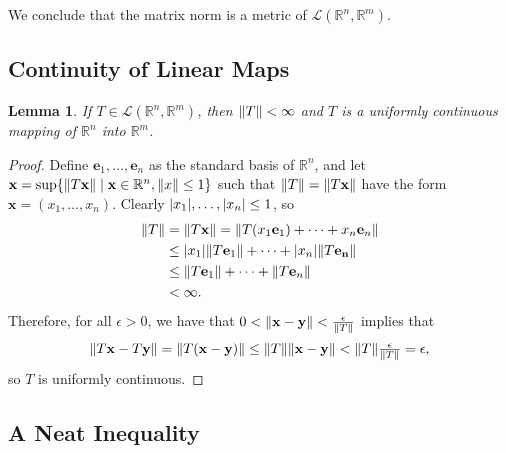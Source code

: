 \documentclass[11pt]{article}
\newtheorem*{lemma*}{Lemma}
\renewcommand{\vec}[1]{\mathbf{#1}}
\begin{document}
We conclude that the matrix norm is a metric of $\mathcal{L} (\mathbb{R}^{n}, \mathbb{R}^{m})$.

\subsection{Continuity of Linear Maps}

\begin{adjustwidth}{1cm}{}
	\begin{lemma*}
		If $T \in \mathcal{L}(\mathbb{R}^{n}, \mathbb{R}^{m})$, then $\norm{T} < \infty$ and $T$ is a uniformly continuous mapping of $\mathbb{R}^{n}$ into $\mathbb{R}^{m}$.
	\end{lemma*}
    \begin{proof}\renewcommand{\qedsymbol}{}
		Define $\vec{e}_{1}, \ldots, \vec{e}_{n}$ as the standard basis of $\mathbb{R}^{n}$, and let $\vec{x} = \sup \{ \norm{T \vec{x}} \mid \vec{x} \in \mathbb{R}^{n}, \norm{x} \le 1\}$ such that $\norm{T} = \norm{T \vec{x}}$ have the form $\vec{x} = (x_{1}, \ldots, x_{n})$. Clearly $\abs{x_{1}}, \ldots, \abs{x_{n}} \le 1$, so
		\begin{align*}
			\norm{T} &= \norm{T \vec{x}} = \norm{T(x_{1} \vec{e}_{1}) + \cdots + x_{n} \vec{e}_{n}} \\ 
			&\le \abs{x_{1}} \norm{T \vec{e}_{1}} + \cdots + \abs{x_{n}} \norm{T \vec{e_{n}}} \\
			&\le \norm{T \vec{e}_1} + \cdots + \norm{T \vec{e}_{n}} \\
			&< \infty.
		\end{align*}
		Therefore, for all $\epsilon > 0$, we have that $0 < \norm{\vec{x} - \vec{y}} < \tfrac{\epsilon}{\norm{T}}$ implies that
		\[
			\norm{T \vec{x} - T \vec{y}} = \norm{T(\vec{x} - \vec{y})} \le \norm{T} \norm{\vec{x} - \vec{y}} < \norm{T} \tfrac{\epsilon}{\norm{T}} = \epsilon,
		\]
		so $T$ is uniformly continuous.
	\end{proof}
\end{adjustwidth}

\subsection{A Neat Inequality}
\end{document}
